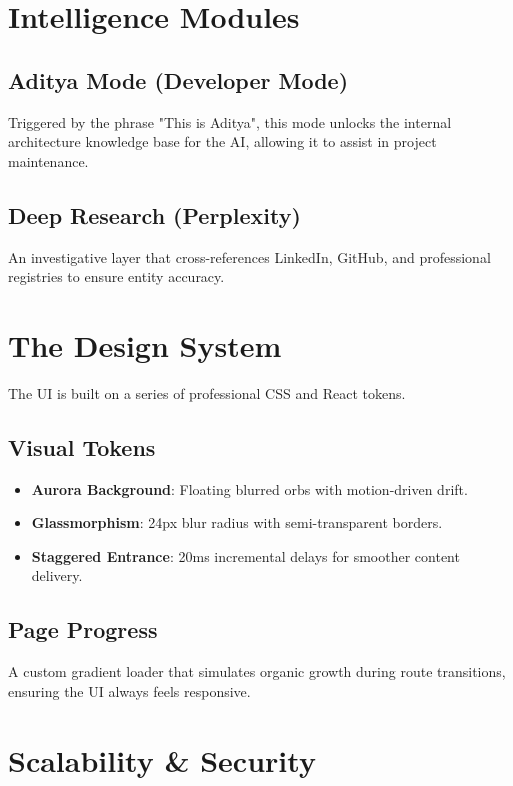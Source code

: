 \documentclass[11pt,a4paper]{article}
\begin{document}
\section{Intelligence Modules}

\subsection{Aditya Mode (Developer Mode)}
Triggered by the phrase "This is Aditya", this mode unlocks the internal architecture knowledge base for the AI, allowing it to assist in project maintenance.

\subsection{Deep Research (Perplexity)}
An investigative layer that cross-references LinkedIn, GitHub, and professional registries to ensure entity accuracy.

\section{The Design System}
The UI is built on a series of professional CSS and React tokens.

\subsection{Visual Tokens}
\begin{itemize}
    \item \textbf{Aurora Background}: Floating blurred orbs with motion-driven drift.
    \item \textbf{Glassmorphism}: 24px blur radius with semi-transparent borders.
    \item \textbf{Staggered Entrance}: 20ms incremental delays for smoother content delivery.
\end{itemize}

\subsection{Page Progress}
A custom gradient loader that simulates organic growth during route transitions, ensuring the UI always feels responsive.

\section{Scalability \& Security}
\end{document}
